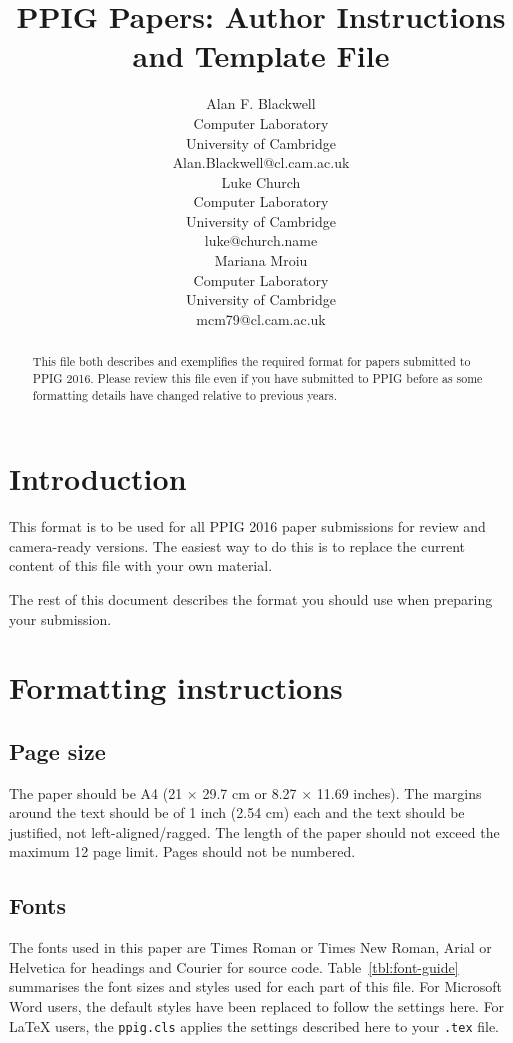 \documentclass{ppig}
\title{PPIG Papers: Author Instructions and Template File}
\author{Alan F. Blackwell \\
  Computer Laboratory \\
  University of Cambridge \\
  Alan.Blackwell@cl.cam.ac.uk \\
  \And
  Luke Church \\
  Computer Laboratory \\
  University of Cambridge \\
  luke@church.name \\
  \And
  Mariana M\unichar{259}r\unichar{259}\unichar{537}oiu\\
  Computer Laboratory \\
  University of Cambridge \\
  mcm79@cl.cam.ac.uk}
\date{}
\begin{document}
\maketitle
\thispagestyle{empty}

\begin{abstract}
This file both describes and exemplifies the required format for papers submitted to PPIG 2016. Please review this file even if you have submitted to PPIG before as some formatting details have changed relative to previous years.
\end{abstract}

\section{Introduction}

This format is to be used for all PPIG 2016 paper submissions for review and camera-ready versions. The easiest way to do this is to replace the current content of this file with your own material.

The rest of this document describes the format you should use when preparing your submission.

\section{Formatting instructions}

\subsection{Page size}

The paper should be A4 (21 $\times$ 29.7 cm or 8.27 $\times$ 11.69 inches). The margins around the text should be of 1 inch (2.54 cm) each and the text should be justified, not left-aligned/ragged. The length of the paper should not exceed the maximum 12 page limit. Pages should not be numbered.

\subsection{Fonts}

The fonts used in this paper are Times Roman or Times New Roman, Arial or Helvetica for headings and Courier for source code. Table~\ref{tbl:font-guide} summarises the font sizes and styles used for each part of this file. For Microsoft Word users, the default styles have been replaced to follow the settings here. For \LaTeX{} users, the \texttt{ppig.cls} applies the settings described here to your \texttt{.tex} file.
\end{document}

